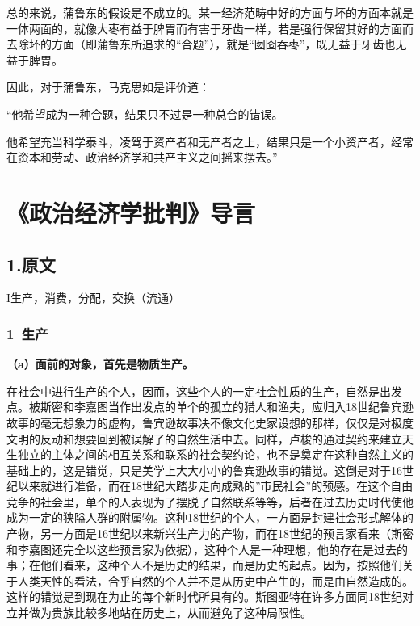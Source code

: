 \documentclass[a4paper,twoside,12pt]{ctexart}
\begin{document}
总的来说，蒲鲁东的假设是不成立的。某一经济范畴中好的方面与坏的方面本就是一体两面的，就像大枣有益于脾胃而有害于牙齿一样，若是强行保留其好的方面而去除坏的方面（即蒲鲁东所追求的“合题”），就是“囫囵吞枣”，既无益于牙齿也无益于脾胃。

因此，对于蒲鲁东，马克思如是评价道：

\begin{fangsong}
    “他希望成为一种合题，结果只不过是一种总合的错误。

    他希望充当科学泰斗，凌驾于资产者和无产者之上，结果只是一个小资产者，经常在资本和劳动、政治经济学和共产主义之间摇来摆去。”
\end{fangsong}




\newpage
\section{《政治经济学批判》导言}
\subsection{1.原文}
\begin{center}
 I生产，消费，分配，交换（流通）    
\end{center}
\subsubsection{1~生产}
\textbf{（a）面前的对象，首先是物质生产。}

在社会中进行生产的个人，因而，这些个人的一定社会性质的生产，自然是出发点。被斯密和李嘉图当作出发点的单个的孤立的猎人和渔夫，应归入18世纪鲁宾逊故事的毫无想象力的虚构，鲁宾逊故事决不像文化史家设想的那样，仅仅是对极度文明的反动和想要回到被误解了的自然生活中去。同样，卢梭的通过契约来建立天生独立的主体之间的相互关系和联系的社会契约论，也不是奠定在这种自然主义的基础上的，这是错觉，只是美学上大大小小的鲁宾逊故事的错觉。这倒是对于16世纪以来就进行准备，而在18世纪大踏步走向成熟的”市民社会”的预感。在这个自由竞争的社会里，单个的人表现为了摆脱了自然联系等等，后者在过去历史时代使他成为一定的狭隘人群的附属物。这种18世纪的个人，一方面是封建社会形式解体的产物，另一方面是16世纪以来新兴生产力的产物，而在18世纪的预言家看来（斯密和李嘉图还完全以这些预言家为依据），这种个人是一种理想，他的存在是过去的事；在他们看来，这种个人不是历史的结果，而是历史的起点。因为，按照他们关于人类天性的看法，合乎自然的个人并不是从历史中产生的，而是由自然造成的。这样的错觉是到现在为止的每个新时代所具有的。斯图亚特在许多方面同18世纪对立并做为贵族比较多地站在历史上，从而避免了这种局限性。
\end{document}
